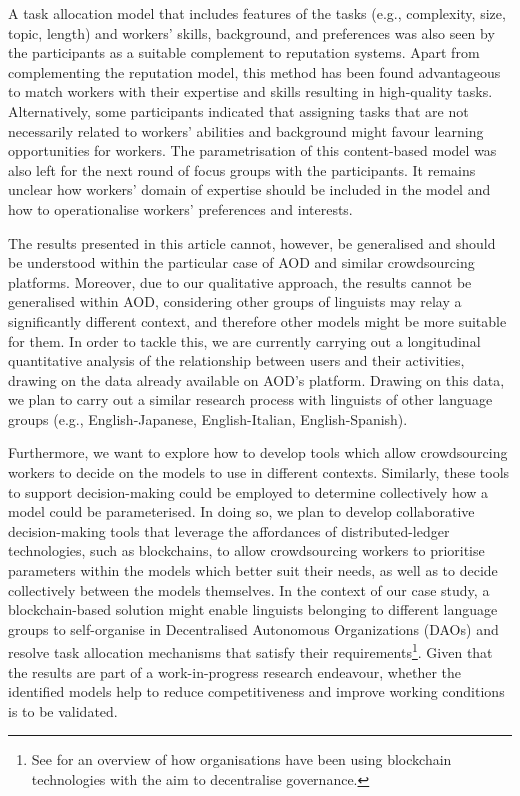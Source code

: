 A task allocation model that includes features of the tasks (e.g., complexity, size, topic, length) and workers' skills, background, and preferences was also seen by the participants as a suitable complement to reputation systems. Apart from complementing the reputation model, this method has been found advantageous to match workers with their expertise and skills resulting in high-quality tasks. Alternatively, some participants indicated that assigning tasks that are not necessarily related to workers' abilities and background might favour learning opportunities for workers. The parametrisation of this content-based model was also left for the next round of focus groups with the participants. It remains unclear how workers' domain of expertise should be included in the model and how to operationalise workers' preferences and interests.

The results presented in this article cannot, however, be generalised and should be understood within the particular case of AOD and similar crowdsourcing platforms. Moreover, due to our qualitative approach, the results cannot be generalised within AOD, considering other groups of linguists may relay a significantly different context, and therefore other models might be more suitable for them. In order to tackle this, we are currently carrying out a longitudinal quantitative analysis of the relationship between users and their activities, drawing on the data already available on AOD’s platform. Drawing on this data, we plan to carry out a similar research process with linguists of other language groups (e.g., English-Japanese, English-Italian, English-Spanish).

Furthermore, we want to explore how to develop tools which allow crowdsourcing workers to decide on the models to use in different contexts. Similarly, these tools to support decision-making could be employed to determine collectively how a model could be parameterised. In doing so, we plan to  develop collaborative decision-making tools that leverage the affordances \cite{doi:10.1177/21582440211002526, 10.3389/fbloc.2021.577680} of distributed-ledger technologies, such as blockchains, to allow crowdsourcing workers to prioritise parameters within the models which better suit their needs, as well as to decide collectively between the models themselves. In the context of our case study, a blockchain-based solution might enable linguists belonging to different language groups to self-organise in Decentralised Autonomous Organizations (DAOs) and resolve task allocation mechanisms that satisfy their requirements\footnote{See \cite{el2020overview} for an overview of how organisations have been using blockchain technologies with the aim to decentralise governance.}. Given that the results are part of a work-in-progress research endeavour, whether the identified models help to reduce competitiveness and improve  working conditions is to be validated.
